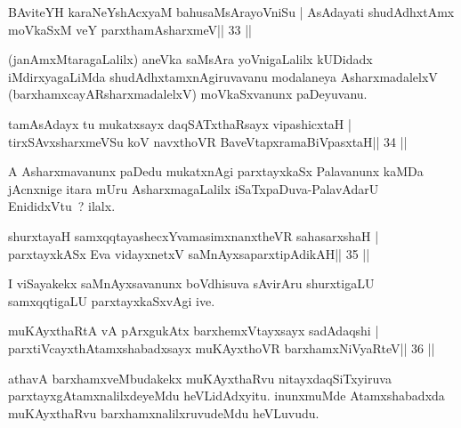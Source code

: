 

\begin{shl}
BAviteYH karaNeYshAcxyaM bahusaMsArayoVniSu |
AsAdayati shudAdhxtAmx moVkaSxM veY parxthamAsharxmeV\hfill || 33 ||
\end{shl}

\begin{artha}
(janAmxMtaragaLalilx) aneVka saMsAra yoVnigaLalilx kUDidadx   iMdirxyagaLiMda shudAdhxtamxnAgiruvavanu modalaneya AsharxmadalelxV (barxhamxcayARsharxmadalelxV) moVkaSxvanunx paDeyuvanu.
\end{artha}

\begin{shl}
tamAsAdayx tu mukatxsayx daqSATxthaRsayx vipashicxtaH |
tirxSAvxsharxmeVSu koV navxthoVR BaveVtapxramaBiVpasxtaH\hfill || 34 ||
\end{shl}

\begin{artha}
A Asharxmavanunx paDedu mukatxnAgi parxtayxkaSx Palavanunx kaMDa jAcnxnige itara mUru AsharxmagaLalilx iSaTxpaDuva-PalavAdarU EnididxVtu~? ilalx.
\end{artha}

\begin{shl}
shurxtayaH samxqqtayashecxYvamasimxnanxtheVR sahasarxshaH |
parxtayxkASx Eva vidayxnetxV saMnAyxsaparxtipAdikAH\hfill || 35 ||
\end{shl}

\begin{artha}
I viSayakekx saMnAyxsavanunx boVdhisuva sAvirAru shurxtigaLU
samxqqtigaLU parxtayxkaSxvAgi ive.
\end{artha}


\begin{shl}
muKAyxthaRtA vA pArxgukAtx barxhemxVtayxsayx sadAdaqshi |
parxtiVcayxthA\s tamxshabadxsayx muKAyxthoVR barxhamxNiVyaRteV\hfill || 36 ||
\end{shl}

\begin{artha}
athavA barxhamxveMbudakekx muKAyxthaRvu nitayxdaqSiTxyiruva
parxtayxgAtamxnalilxdeyeMdu heVLidAdxyitu. inunxmuMde Atamxshabadxda
muKAyxthaRvu barxhamxnalilxruvudeMdu heVLuvudu.
\end{artha}



